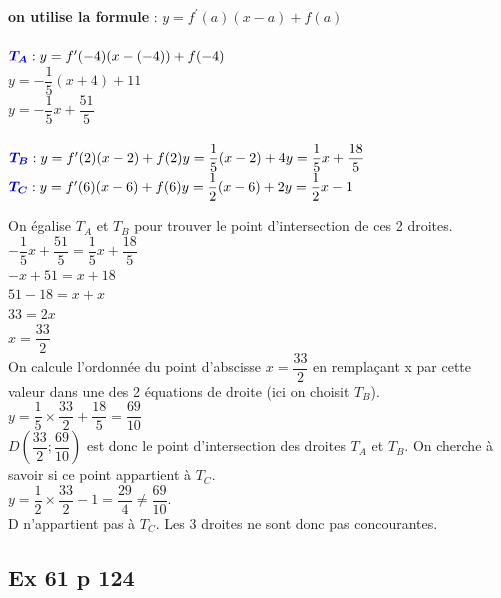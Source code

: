 \documentclass[12pt,a5paper]{book}
\begin{document}
\begin{enumMet}
    \item \textbf{on utilise la formule} : $y=f^{\prime}(a)(x-a)+f(a)$\\
    \ \\
    $\mBleu{T_{A}}: y=f^{\prime}(-4)(x-(-4))+f(-4)$\\
    $y=-\dfrac{1}{5}(x+4)+11$\\
    $y=-\dfrac{1}{5} x+\dfrac{51}{5}$\\
    \ \\
    $\mBleu{T_{B}}: y=f^{\prime}(2)(x-2)+f(2) \\ y=\dfrac{1}{5}(x-2)+4 \\ y=\dfrac{1}{5} x+\dfrac{18}{5} \\$
    \ \\
    $\mBleu{T_{C}}: y=f^{\prime}(6)(x-6)+f(6) \\ y=\dfrac{1}{2}(x-6)+2 \\ y=\dfrac{1}{2} x-1$
    \item On égalise $T_{A}$ et $T_{B}$ pour trouver le point d'intersection de ces 2 droites.\\
    $-\dfrac{1}{5} x+\dfrac{51}{5}=\dfrac{1}{5} x+\dfrac{18}{5}$\\
    $-x+51=x+18$\\
    $51-18=x+x$\\
    $33=2 x$\\
    $x=\dfrac{33}{2}$\\
    On calcule l'ordonnée du point d'abscisse $x=\dfrac{33}{2}$ en remplaçant x par cette valeur dans une des 2 équations de droite (ici on choisit $T_B$).\\
    $y=\dfrac{1}{5}\times\dfrac{33}{2}+\dfrac{18}{5}=\dfrac{69}{10}$\\
    $D\left(\dfrac{33}{2};\dfrac{69}{10}\right)$ est donc le point d'intersection des droites $T_{A}$ et $T_{B}$. On cherche à savoir si ce point appartient à $T_C$.\\
    $y=\dfrac{1}{2}\times\dfrac{33}{2}-1=\dfrac{29}{4}\neq\dfrac{69}{10}$.\\
    D n'appartient pas à $T_C$. Les 3 droites ne sont donc pas concourantes.
\end{enumMet}



\subsection*{Ex 61 p 124}
\end{document}
